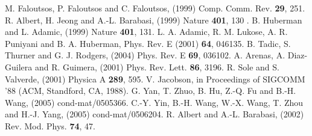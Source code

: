 \documentclass[runningheads]{llncs}
\begin{document}
\begin{thebibliography}{11}
M. Faloutsos, P. Faloutsos and C. Faloutsos, (1999) Comp. Comm. Rev.
{\bf 29}, 251.
R. Albert, H. Jeong and A.-L. Barabasi, (1999) Nature {\bf 401}, 130
.
B. Huberman and L. Adamic, (1999) Nature {\bf 401}, 131.
L. A. Adamic, R. M. Lukose, A. R. Puniyani and B. A. Huberman,
Phys. Rev. E (2001) {\bf 64}, 046135.
B. Tadic, S. Thurner and G. J. Rodgers, (2004) Phys. Rev. E {\bf 69},
036102.
A. Arenas, A. Diaz-Guilera and R. Guimera, (2001) Phys. Rev.
Lett. {\bf 86}, 3196.
R. Sole and S. Valverde, (2001) Physica A {\bf 289}, 595.
V. Jacobson, in Proceedings of SIGCOMM '88 (ACM, Standford, CA,
1988).
G. Yan, T. Zhuo, B. Hu, Z.-Q. Fu and B.-H. Wang, (2005)
cond-mat/0505366.
C.-Y. Yin, B.-H. Wang, W.-X. Wang, T. Zhou and H.-J. Yang, (2005)
cond-mat/0506204.
R. Albert and A.-L. Barabasi, (2002) Rev. Mod. Phys. {\bf
74}, 47.


\end{thebibliography}
\end{document}
